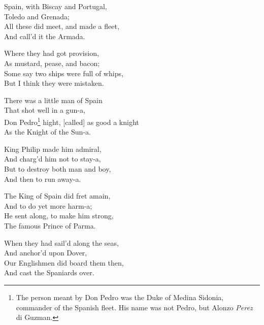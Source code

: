 \settowidth{\versewidth}{Don Pedroa  hight, [called] as good a knight}
\begin{dcverse}

\begin{altverse}
Spain, with Biscay and Portugal,\\
Toledo and Grenada;\\
All these did meet, and made a fleet,\\
And call’d it the Armada.
\end{altverse}

\begin{altverse}
Where they had got provision,\\
As mustard, pease, and bacon;\\
Some say two ships were full of whips,\\
But I think they were mistaken.
\end{altverse}

\begin{altverse}
There was a little man of Spain\\
That shot well in a gun-a,\\
Don Pedro\footnote{\textit{}
The person meant by Don Pedro was the Duke of
Medina Sidonia, commander of the Spanish fleet. His
name was not Pedro, but Alonzo \textit{Perez} di Guzman.}
  hight, [called] as good a knight\\
As the Knight of the Sun-a.
\end{altverse}

\begin{altverse}
King Philip made him admiral,\\
And charg’d him not to stay-a,\\
But to destroy both man and boy,\\
And then to run away-a.
\end{altverse}

\begin{altverse}
The King of Spain did fret amain,\\
And to do yet more harm-a;\\
He sent along, to make him strong,\\
The famous Prince of Parma.
\end{altverse}

\begin{altverse}
When they had sail’d along the seas,\\
And anchor’d upon Dover,\\
Our Englishmen did board them then,\\
And cast the Spaniards over.
\end{altverse}


\end{dcverse}
